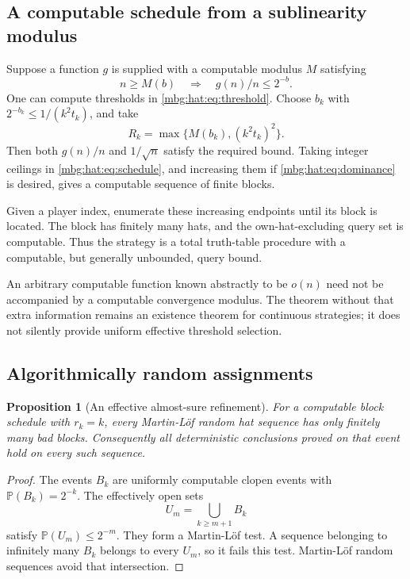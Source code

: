 \documentclass[11pt,letterpaper]{article}
\newtheorem{proposition}[theorem]{Proposition}
\theoremstyle{definition}
\newcommand{\Prb}{\mathbb P}
\begin{document}
\subsection{A computable schedule from a sublinearity modulus}

Suppose a function \(g\) is supplied with a computable modulus
\(M\) satisfying
\[
  n\ge M(b)\quad\Longrightarrow\quad
  g(n)/n\le2^{-b}.
\]
One can compute thresholds in \eqref{mbg:hat:eq:threshold}.
Choose \(b_k\) with \(2^{-b_k}\le1/(k^2t_k)\), and take
\[
  R_k=\max\{M(b_k),(k^2t_k)^2\}.
\]
Then both \(g(n)/n\) and \(1/\sqrt n\) satisfy the required bound.
Taking integer ceilings in \eqref{mbg:hat:eq:schedule}, and increasing
them if \eqref{mbg:hat:eq:dominance} is desired, gives a computable
sequence of finite blocks.

Given a player index, enumerate these increasing endpoints until
its block is located. The block has finitely many hats, and the
own-hat-excluding query set is computable. Thus the strategy is
a total truth-table procedure with a computable, but generally
unbounded, query bound.

An arbitrary computable function known abstractly to be \(o(n)\)
need not be accompanied by a computable convergence modulus.
The theorem without that extra information remains an existence
theorem for continuous strategies; it does not silently provide
uniform effective threshold selection.

\subsection{Algorithmically random assignments}

\begin{proposition}[An effective almost-sure refinement]
\label{mbg:hat:prop:mlrandom}
For a computable block schedule with \(r_k=k\), every Martin-L\"of
random hat sequence has only finitely many bad blocks.
Consequently all deterministic conclusions proved on that event
hold on every such sequence.
\end{proposition}
\begin{proof}
The events \(B_k\) are uniformly computable clopen events with
\(\Prb(B_k)=2^{-k}\). The effectively open sets
\[
  U_m=\bigcup_{k\ge m+1}B_k
\]
satisfy \(\Prb(U_m)\le2^{-m}\). They form a Martin-L\"of test.
A sequence belonging to infinitely many \(B_k\) belongs to every
\(U_m\), so it fails this test. Martin-L\"of random sequences avoid
that intersection.
\end{proof}
\end{document}
